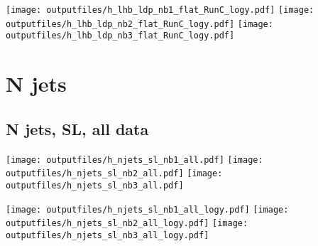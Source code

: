 \documentclass[11pt]{article}
\begin{document}
    \noindent
     \texttt{[image: outputfiles/h\_lhb\_ldp\_nb1\_flat\_RunC\_logy.pdf]}
     \texttt{[image: outputfiles/h\_lhb\_ldp\_nb2\_flat\_RunC\_logy.pdf]}
     \texttt{[image: outputfiles/h\_lhb\_ldp\_nb3\_flat\_RunC\_logy.pdf]}
















  \clearpage
   \section{ N jets }

    \subsection{ N jets, SL, all data}

    \noindent
     \texttt{[image: outputfiles/h\_njets\_sl\_nb1\_all.pdf]}
     \texttt{[image: outputfiles/h\_njets\_sl\_nb2\_all.pdf]}
     \texttt{[image: outputfiles/h\_njets\_sl\_nb3\_all.pdf]}

    \noindent
     \texttt{[image: outputfiles/h\_njets\_sl\_nb1\_all\_logy.pdf]}
     \texttt{[image: outputfiles/h\_njets\_sl\_nb2\_all\_logy.pdf]}
     \texttt{[image: outputfiles/h\_njets\_sl\_nb3\_all\_logy.pdf]}


\end{document}
